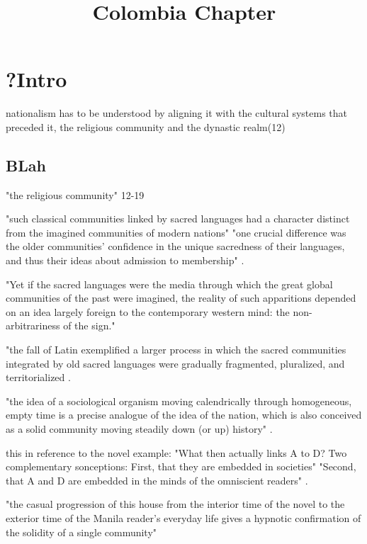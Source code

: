 \documentclass[12pt]{article}
\title{Colombia Chapter}
\makeatletter
\newcommand\iraggedright{%
	\let\\\@centercr\@rightskip\@flushglue \rightskip\@rightskip
	\leftskip\z@skip}
\makeatother
\begin{document}
	\makeheader
	\iraggedright
\section{?Intro}
nationalism has to be understood by aligning it with the cultural systems that preceded it, the religious community and the dynastic realm(12)
\subsection{BLah}
"the religious community" 12-19

"such classical communities linked by sacred languages had a character distinct from the imagined communities of modern nations"
"one crucial difference was the older communities' confidence in the unique sacredness of their languages, and thus their ideas about admission to membership" \cite[13]{Anderson2006}.

"Yet if the sacred languages were the media through which the great global communities of the past were imagined, the reality of such apparitions depended on an idea largely foreign to the contemporary western mind: the non-arbitrariness of the sign."

"the fall of Latin exemplified a larger process in which the sacred communities integrated by old sacred languages were gradually fragmented, pluralized, and territorialized \cite[19]{Anderson2006}. 

"the idea of a sociological organism moving calendrically through homogeneous, empty time is a precise analogue of the idea of the nation, which is also conceived as a solid community moving steadily down (or up) history" \cite[26]{Anderson2006}.

this in reference to the novel example:
"What then actually links A to D? Two complementary sonceptions: First, that they are embedded in societies"
"Second, that A and D are embedded in the minds of the omniscient readers" \cite[26]{Anderson2006}.

"the casual progression of this house from the interior time of the novel to the exterior time of the Manila reader's everyday life gives a hypnotic confirmation of the solidity of a single community" \cite[27]{Anderson2006}
\end{document}
